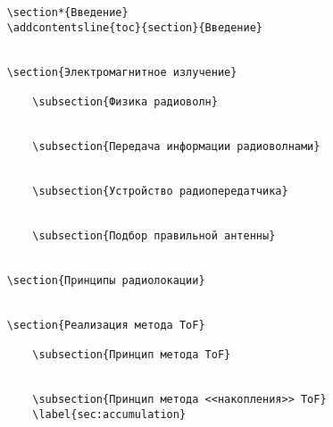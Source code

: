 \begin{verbatim}
    \section*{Введение}
    \addcontentsline{toc}{section}{Введение}
    

    \section{Электромагнитное излучение}

        \subsection{Физика радиоволн}
        

        \subsection{Передача информации радиоволнами}
        

        \subsection{Устройство радиопередатчика}
        

        \subsection{Подбор правильной антенны}
        

    \section{Принципы радиолокации}
    

    \section{Реализация метода ToF}

        \subsection{Принцип метода ToF}
        

        \subsection{Принцип метода <<накопления>> ToF}
        \label{sec:accumulation}
        


\end{verbatim}
